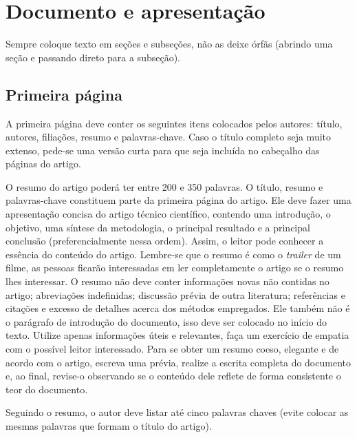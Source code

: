 \section{Documento e apresentação}

Sempre coloque texto em seções e subseções, não as deixe órfãs (abrindo uma seção e passando direto para a subseção).

\subsection{Primeira página}

A primeira página deve conter os seguintes itens colocados pelos autores: título, autores, filiações, resumo e palavras-chave. 
%
Caso o título completo seja muito extenso, pede-se uma versão curta para que seja incluída no cabeçalho das páginas do artigo. 

O resumo do artigo poderá ter entre 200 e 350 palavras. O título, resumo e palavras-chave constituem parte da primeira página do artigo. Ele deve fazer uma apresentação concisa do artigo técnico científico, contendo uma introdução, o objetivo, uma síntese da metodologia, o principal resultado e a principal conclusão (preferencialmente nessa ordem). Assim, o leitor pode conhecer a essência do conteúdo do artigo. Lembre-se que o resumo é como o \textit{trailer} de um filme, as pessoas ficarão interessadas em ler completamente o artigo se o resumo lhes interessar. O resumo não deve conter informações novas não contidas no artigo; abreviações indefinidas; discussão prévia de outra literatura; referências e citações e excesso de detalhes acerca dos métodos empregados. Ele também não é o parágrafo de introdução do documento, isso deve ser colocado no início do texto. Utilize apenas informações úteis e relevantes, faça um exercício de empatia com o possível leitor interessado. Para se obter um resumo coeso, elegante e de acordo com o artigo, escreva uma prévia, realize a escrita completa do documento e, ao final, revise-o observando se o conteúdo dele reflete de forma consistente o teor do documento. 

Seguindo o resumo, o autor deve listar até cinco palavras chaves (evite colocar as mesmas palavras que formam o título do artigo).

